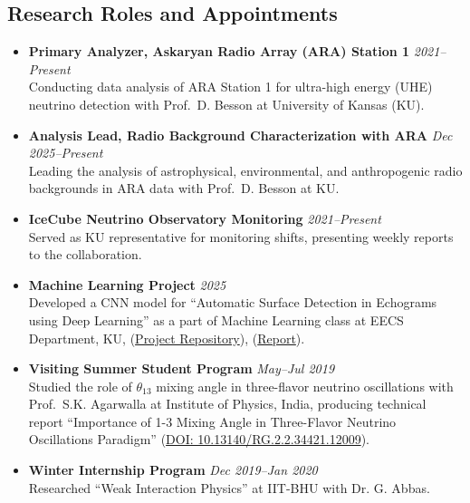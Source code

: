 \documentclass[10pt]{report}
\begin{document}
\subsection*{Research Roles and Appointments}
\begin{itemize}

    \item \textbf{Primary Analyzer, Askaryan Radio Array (ARA) Station 1}  \textit{2021--Present} \\
    Conducting data analysis of ARA Station 1 for ultra-high energy (UHE) neutrino detection with Prof.\ D. Besson at University of Kansas (KU).

    \item \textbf{Analysis Lead, Radio Background Characterization with ARA}  \textit{Dec 2025--Present} \\
    Leading the analysis of astrophysical, environmental, and anthropogenic radio backgrounds in ARA data with Prof.\  D. Besson at KU.

    \item \textbf{IceCube Neutrino Observatory Monitoring}  \textit{2021--Present} \\
    Served as KU representative for monitoring shifts, presenting weekly reports to the collaboration.

    \item \textbf{Machine Learning Project}  \textit{2025} \\
    Developed a CNN model for ``Automatic Surface Detection in Echograms using Deep Learning'' as a part of Machine Learning class at EECS Department, KU, (\href{https://github.com/Mohammad-Neutrino/Machine_Learning_Project}{Project Repository}), (\href{https://github.com/Mohammad-Neutrino/Machine_Learning_Project/blob/trunk/Project/report/final_report.pdf}{Report}).

    \item \textbf{Visiting Summer Student Program}  \textit{May--Jul 2019} \\
    Studied the role of $\theta_{13}$ mixing angle in three-flavor neutrino oscillations with Prof.\ S.K. Agarwalla at Institute of Physics, India, producing technical report ``Importance of 1-3 Mixing Angle in Three-Flavor Neutrino Oscillations Paradigm'' (\href{https://www.researchgate.net/publication/340095776_Importance_of_1-3_Mixing_Angle_in_Three-Flavor_Neutrino_Oscillations_Paradigm_SSVP_Summer_Project_Report}{DOI: 10.13140/RG.2.2.34421.12009}).

    \item \textbf{Winter Internship Program}  \textit{Dec 2019--Jan 2020} \\
    Researched ``Weak Interaction Physics'' at IIT-BHU with Dr. G. Abbas.
    
\end{itemize} 
\end{document}
